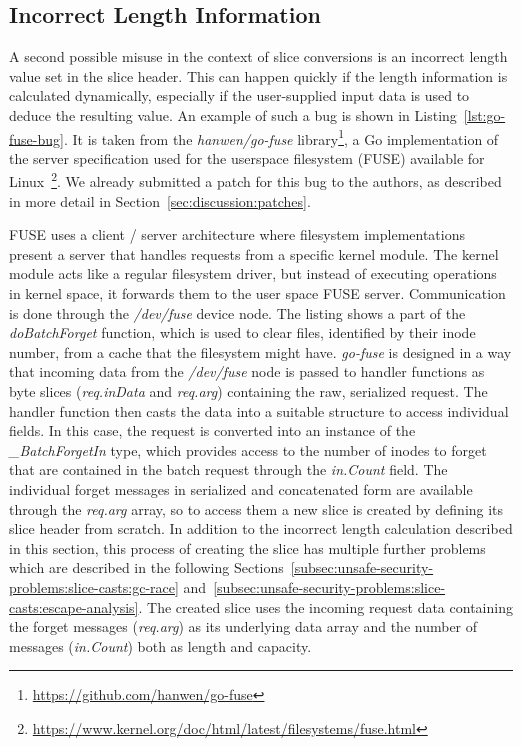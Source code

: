 \subsection{Incorrect Length Information}\label{subsec:unsafe-security-problems:slice-casts:incorrect-length}

A second possible misuse in the context of slice conversions is an incorrect length value set in the slice header.
This can happen quickly if the length information is calculated dynamically, especially if the user-supplied input data
is used to deduce the resulting value.
An example of such a bug is shown in Listing~\ref{lst:go-fuse-bug}.
It is taken from the \textit{hanwen/go-fuse} library\footnote{\url{https://github.com/hanwen/go-fuse}}, a Go
implementation of the server specification used for the userspace filesystem (\acrshort{FUSE}) available for
Linux~\footnote{\url{https://www.kernel.org/doc/html/latest/filesystems/fuse.html}}.
We already submitted a patch for this bug to the authors, as described in more detail in
Section~\ref{sec:discussion:patches}.



\acrshort{FUSE} uses a client / server architecture where filesystem implementations present a server that handles
requests from a specific kernel module.
The kernel module acts like a regular filesystem driver, but instead of executing operations in kernel space, it
forwards them to the user space \acrshort{FUSE} server.
Communication is done through the \textit{/dev/fuse} device node.
The listing shows a part of the \textit{doBatchForget} function, which is used to clear files, identified by their inode
number, from a cache that the filesystem might have.
\textit{go-fuse} is designed in a way that incoming data from the \textit{/dev/fuse} node is passed to handler functions
as byte slices (\textit{req.inData} and \textit{req.arg}) containing the raw, serialized request.
The handler function then casts the data into a suitable structure to access individual fields.
In this case, the request is converted into an instance of the \textit{\_BatchForgetIn} type, which provides access to
the number of inodes to forget that are contained in the batch request through the \textit{in.Count} field.
The individual forget messages in serialized and concatenated form are available through the \textit{req.arg} array, so
to access them a new slice is created by defining its slice header from scratch.
In addition to the incorrect length calculation described in this section, this process of creating the slice has
multiple further problems which are described in the following Sections~\ref{subsec:unsafe-security-problems:slice-casts:gc-race}
and~\ref{subsec:unsafe-security-problems:slice-casts:escape-analysis}.
The created slice uses the incoming request data containing the forget messages (\textit{req.arg}) as its underlying
data array and the number of messages (\textit{in.Count}) both as length and capacity.

